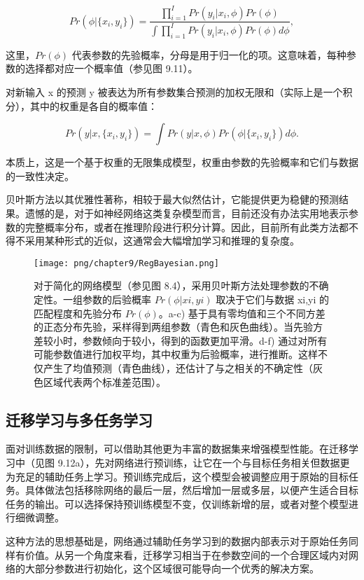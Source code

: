 \begin{equation}
Pr(\phi | \{x_i, y_i\}) = \frac{\prod_{i=1}^{I} Pr(y_i|x_i, \phi)Pr(\phi)}{\int \prod_{i=1}^{I} Pr(y_i|x_i, \phi)Pr(\phi)d\phi}, 
\end{equation}

这里，\(Pr(\phi)\) 代表参数的先验概率，分母是用于归一化的项。这意味着，每种参数的选择都对应一个概率值（参见图 9.11）。

对新输入 x 的预测 y 被表达为所有参数集合预测的加权无限和（实际上是一个积分），其中的权重是各自的概率值：

\begin{equation}
Pr(y|x, \{x_i, y_i\}) = \int Pr(y|x, \phi)Pr(\phi | \{x_i, y_i\})d\phi. 
\end{equation}

本质上，这是一个基于权重的无限集成模型，权重由参数的先验概率和它们与数据的一致性决定。

贝叶斯方法以其优雅性著称，相较于最大似然估计，它能提供更为稳健的预测结果。遗憾的是，对于如神经网络这类复杂模型而言，目前还没有办法实用地表示参数的完整概率分布，或者在推理阶段进行积分计算。因此，目前所有此类方法都不得不采用某种形式的近似，这通常会大幅增加学习和推理的复杂度。

\begin{figure}[ht!]
	\centering
	\texttt{[image: png/chapter9/RegBayesian.png]}
	\caption{对于简化的网络模型（参见图 8.4），采用贝叶斯方法处理参数的不确定性。一组参数的后验概率 \(Pr(\phi|{xi,yi})\) 取决于它们与数据 {xi,yi} 的匹配程度和先验分布 \(Pr(\phi)\)。a-c) 基于具有零均值和三个不同方差的正态分布先验，采样得到两组参数（青色和灰色曲线）。当先验方差较小时，参数倾向于较小，得到的函数更加平滑。d-f) 通过对所有可能参数值进行加权平均，其中权重为后验概率，进行推断。这样不仅产生了均值预测（青色曲线），还估计了与之相关的不确定性（灰色区域代表两个标准差范围）。}
\end{figure}


\subsection{迁移学习与多任务学习}
面对训练数据的限制，可以借助其他更为丰富的数据集来增强模型性能。在迁移学习中（见图 9.12a），先对网络进行预训练，让它在一个与目标任务相关但数据更为充足的辅助任务上学习。预训练完成后，这个模型会被调整应用于原始的目标任务。具体做法包括移除网络的最后一层，然后增加一层或多层，以便产生适合目标任务的输出。可以选择保持预训练模型不变，仅训练新增的层，或者对整个模型进行细微调整。

这种方法的思想基础是，网络通过辅助任务学习到的数据内部表示对于原始任务同样有价值。从另一个角度来看，迁移学习相当于在参数空间的一个合理区域内对网络的大部分参数进行初始化，这个区域很可能导向一个优秀的解决方案。

